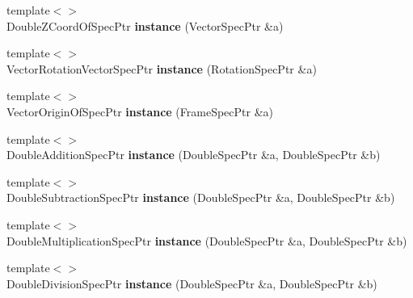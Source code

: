 \begin{DoxyCompactItemize}
\item 
\hypertarget{namespacegiskard__suturo_ad6f9738122921e30e7d579b90d8a2170}{{\footnotesize template$<$$>$ }\\Double\-Z\-Coord\-Of\-Spec\-Ptr {\bfseries instance} (Vector\-Spec\-Ptr \&a)}\label{namespacegiskard__suturo_ad6f9738122921e30e7d579b90d8a2170}

\item 
\hypertarget{namespacegiskard__suturo_a1c65a93c073a2c461aea02e321a3e2b4}{{\footnotesize template$<$$>$ }\\Vector\-Rotation\-Vector\-Spec\-Ptr {\bfseries instance} (Rotation\-Spec\-Ptr \&a)}\label{namespacegiskard__suturo_a1c65a93c073a2c461aea02e321a3e2b4}

\item 
\hypertarget{namespacegiskard__suturo_a9bee52588969bd8f619293da2087bac6}{{\footnotesize template$<$$>$ }\\Vector\-Origin\-Of\-Spec\-Ptr {\bfseries instance} (Frame\-Spec\-Ptr \&a)}\label{namespacegiskard__suturo_a9bee52588969bd8f619293da2087bac6}

\item 
\hypertarget{namespacegiskard__suturo_a65d005d2b35c145ca33c66b591ba53a0}{{\footnotesize template$<$$>$ }\\Double\-Addition\-Spec\-Ptr {\bfseries instance} (Double\-Spec\-Ptr \&a, Double\-Spec\-Ptr \&b)}\label{namespacegiskard__suturo_a65d005d2b35c145ca33c66b591ba53a0}

\item 
\hypertarget{namespacegiskard__suturo_ae5b72d5e0b324780c1c8837c22702d16}{{\footnotesize template$<$$>$ }\\Double\-Subtraction\-Spec\-Ptr {\bfseries instance} (Double\-Spec\-Ptr \&a, Double\-Spec\-Ptr \&b)}\label{namespacegiskard__suturo_ae5b72d5e0b324780c1c8837c22702d16}

\item 
\hypertarget{namespacegiskard__suturo_ad5be22795006c4f7556d01bf6639dd7a}{{\footnotesize template$<$$>$ }\\Double\-Multiplication\-Spec\-Ptr {\bfseries instance} (Double\-Spec\-Ptr \&a, Double\-Spec\-Ptr \&b)}\label{namespacegiskard__suturo_ad5be22795006c4f7556d01bf6639dd7a}

\item 
\hypertarget{namespacegiskard__suturo_abae3ad34754183136e2f72d2aabb0105}{{\footnotesize template$<$$>$ }\\Double\-Division\-Spec\-Ptr {\bfseries instance} (Double\-Spec\-Ptr \&a, Double\-Spec\-Ptr \&b)}\label{namespacegiskard__suturo_abae3ad34754183136e2f72d2aabb0105}


\end{DoxyCompactItemize}
